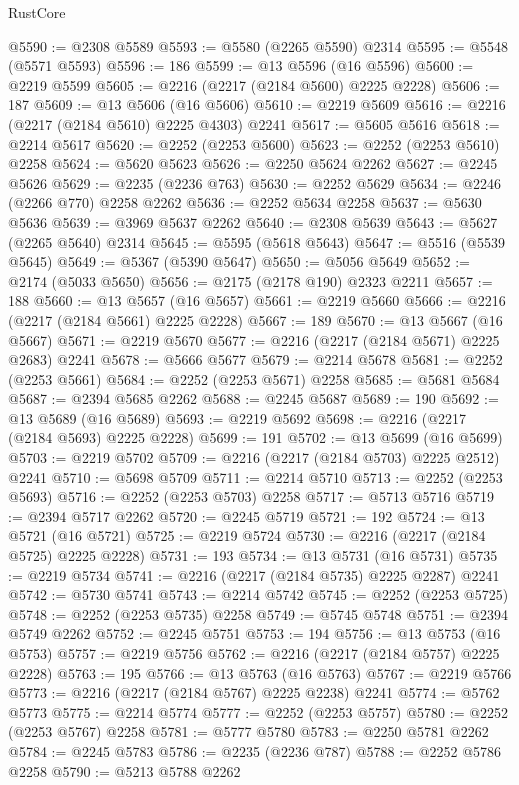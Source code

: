 \begin{lexlean}{RustCore}
\begin{coremodule}
@5590 := @2308 @5589
@5593 := @5580 (@2265 @5590) @2314
@5595 := @5548 (@5571 @5593)
@5596 := 186
@5599 := @13 @5596 (@16 @5596)
@5600 := @2219 @5599
@5605 := @2216 (@2217 (@2184 @5600) @2225 @2228)
@5606 := 187
@5609 := @13 @5606 (@16 @5606)
@5610 := @2219 @5609
@5616 := @2216 (@2217 (@2184 @5610) @2225 @4303) @2241
@5617 := @5605 @5616
@5618 := @2214 @5617
@5620 := @2252 (@2253 @5600)
@5623 := @2252 (@2253 @5610) @2258
@5624 := @5620 @5623
@5626 := @2250 @5624 @2262
@5627 := @2245 @5626
@5629 := @2235 (@2236 @763)
@5630 := @2252 @5629
@5634 := @2246 (@2266 @770) @2258 @2262
@5636 := @2252 @5634 @2258
@5637 := @5630 @5636
@5639 := @3969 @5637 @2262
@5640 := @2308 @5639
@5643 := @5627 (@2265 @5640) @2314
@5645 := @5595 (@5618 @5643)
@5647 := @5516 (@5539 @5645)
@5649 := @5367 (@5390 @5647)
@5650 := @5056 @5649
@5652 := @2174 (@5033 @5650)
@5656 := @2175 (@2178 @190) @2323 @2211
@5657 := 188
@5660 := @13 @5657 (@16 @5657)
@5661 := @2219 @5660
@5666 := @2216 (@2217 (@2184 @5661) @2225 @2228)
@5667 := 189
@5670 := @13 @5667 (@16 @5667)
@5671 := @2219 @5670
@5677 := @2216 (@2217 (@2184 @5671) @2225 @2683) @2241
@5678 := @5666 @5677
@5679 := @2214 @5678
@5681 := @2252 (@2253 @5661)
@5684 := @2252 (@2253 @5671) @2258
@5685 := @5681 @5684
@5687 := @2394 @5685 @2262
@5688 := @2245 @5687
@5689 := 190
@5692 := @13 @5689 (@16 @5689)
@5693 := @2219 @5692
@5698 := @2216 (@2217 (@2184 @5693) @2225 @2228)
@5699 := 191
@5702 := @13 @5699 (@16 @5699)
@5703 := @2219 @5702
@5709 := @2216 (@2217 (@2184 @5703) @2225 @2512) @2241
@5710 := @5698 @5709
@5711 := @2214 @5710
@5713 := @2252 (@2253 @5693)
@5716 := @2252 (@2253 @5703) @2258
@5717 := @5713 @5716
@5719 := @2394 @5717 @2262
@5720 := @2245 @5719
@5721 := 192
@5724 := @13 @5721 (@16 @5721)
@5725 := @2219 @5724
@5730 := @2216 (@2217 (@2184 @5725) @2225 @2228)
@5731 := 193
@5734 := @13 @5731 (@16 @5731)
@5735 := @2219 @5734
@5741 := @2216 (@2217 (@2184 @5735) @2225 @2287) @2241
@5742 := @5730 @5741
@5743 := @2214 @5742
@5745 := @2252 (@2253 @5725)
@5748 := @2252 (@2253 @5735) @2258
@5749 := @5745 @5748
@5751 := @2394 @5749 @2262
@5752 := @2245 @5751
@5753 := 194
@5756 := @13 @5753 (@16 @5753)
@5757 := @2219 @5756
@5762 := @2216 (@2217 (@2184 @5757) @2225 @2228)
@5763 := 195
@5766 := @13 @5763 (@16 @5763)
@5767 := @2219 @5766
@5773 := @2216 (@2217 (@2184 @5767) @2225 @2238) @2241
@5774 := @5762 @5773
@5775 := @2214 @5774
@5777 := @2252 (@2253 @5757)
@5780 := @2252 (@2253 @5767) @2258
@5781 := @5777 @5780
@5783 := @2250 @5781 @2262
@5784 := @2245 @5783
@5786 := @2235 (@2236 @787)
@5788 := @2252 @5786 @2258
@5790 := @5213 @5788 @2262

\end{coremodule}
\end{lexlean}
